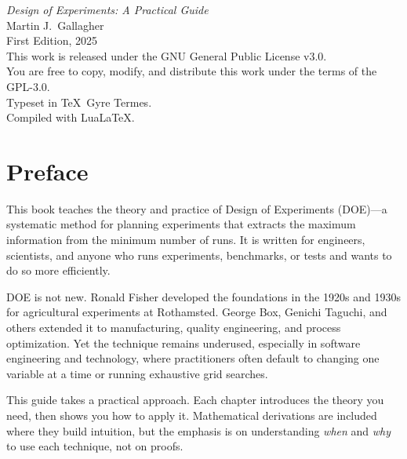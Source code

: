 \documentclass[11pt]{book}
\begin{document}
\thispagestyle{empty}
\vspace*{\fill}
\begin{center}
\small
\textit{Design of Experiments: A Practical Guide}\\[1em]
Martin J.\ Gallagher\\[1em]
First Edition, 2025\\[2em]
This work is released under the GNU General Public License v3.0.\\
You are free to copy, modify, and distribute this work under the terms of the GPL-3.0.\\[2em]
Typeset in \TeX\ Gyre Termes.\\
Compiled with Lua\LaTeX.
\end{center}
\vspace*{\fill}
\clearpage

\tableofcontents

\chapter*{Preface}

This book teaches the theory and practice of Design of Experiments (DOE)---a
systematic method for planning experiments that extracts the maximum information
from the minimum number of runs. It is written for engineers, scientists, and
anyone who runs experiments, benchmarks, or tests and wants to do so more
efficiently.

DOE is not new. Ronald Fisher developed the foundations in the 1920s and 1930s
for agricultural experiments at Rothamsted. George Box, Genichi Taguchi, and
others extended it to manufacturing, quality engineering, and process
optimization. Yet the technique remains underused, especially in software
engineering and technology, where practitioners often default to changing one
variable at a time or running exhaustive grid searches.

This guide takes a practical approach. Each chapter introduces the theory you
need, then shows you how to apply it. Mathematical derivations are included
where they build intuition, but the emphasis is on understanding \emph{when} and
\emph{why} to use each technique, not on proofs.
\end{document}
